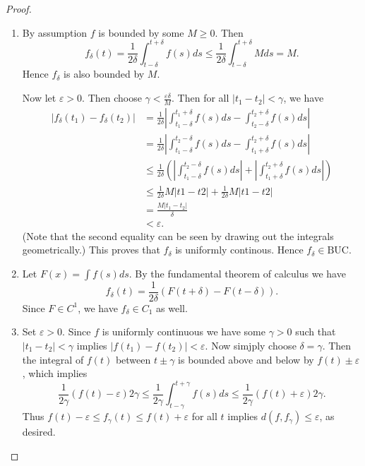 \documentclass[12pt]{article}
\theoremstyle{remark}
\theoremstyle{named}
\renewcommand{\d}{\delta}
\newcommand{\e}{\varepsilon}
\newcommand{\abs}[1]{|#1|}
\newcommand{\bigabs}[1]{\left|#1\right|}
\begin{document}
\begin{proof}
    \hspace*{0in}
    \begin{enumerate}
        \item By assumption \(f\) is bounded by some \(M \ge 0\). Then 
        \[f_\d(t) = \frac{1}{2\d}\int_{t - \d}^{t + \d} f(s)ds \le \frac{1}{2\d}\int_{t - \d}^{t + \d} M ds = M.\]
        Hence \(f_\d\) is also bounded by \(M\). 

        Now let \(\e > 0\). Then choose \(\gamma < \frac{\e \d}{M}\). Then for all \(\abs{t_1 - t_2} < \gamma\), we have
        \begin{align*}
            \abs{f_\d(t_1) - f_\d(t_2)} &= \frac{1}{2\d}\bigabs{\int_{t_1 - \d}^{t_1 + \d} f(s)ds - \int_{t_2 - \d}^{t_2 + \d} f(s)ds} \\
            &= \frac{1}{2\d}\bigabs{\int_{t_1 - \d}^{t_2 - \d} f(s)ds - \int_{t_1 + \d}^{t_2 + \d} f(s)ds} \\
            &\le \frac{1}{2\d}\left(\bigabs{\int_{t_1 - \d}^{t_2 - \d} f(s)ds} + \bigabs{\int_{t_1 + \d}^{t_2 + \d} f(s)ds}\right)\\
            &\le \frac{1}{2\d}M\bigabs{t1 - t2} + \frac{1}{2\d}M\bigabs{t1 - t2} \\
            &= \frac{M\abs{t_1 - t_2}}{\d} \\
            &< \e.
        \end{align*}
        (Note that the second equality can be seen by drawing out the integrals geometrically.) This proves that \(f_\d\) is uniformly continous. Hence \(f_\d \in \text{BUC}\).
        \item Let \(F(x) = \int f(s) ds\). By the fundamental theorem of calculus we have \[f_\d(t) = \frac{1}{2\d}(F(t + \d) - F(t - \d)).\]
        Since \(F \in C^1\), we have \(f_\d \in C_1\) as well.
        \item Set \(\e > 0\). Since \(f\) is uniformly continuous we have some \(\gamma > 0\) such that \(\abs{t_1 - t_2} < \gamma\) implies \(\abs{f(t_1) - f(t_2)} < \e\). Now simjply choose \(\d = \gamma\). Then the integral of \(f(t)\) between \(t \pm \gamma\) is bounded above and below by \(f(t) \pm \e\), which implies  
        \[\frac{1}{2\gamma}(f(t) - \e)2\gamma \le \frac{1}{2\gamma}\int_{t - \gamma}^{t + \gamma} f(s)ds \le \frac{1}{2\gamma}(f(t) + \e)2\gamma.\]
        Thus \(f(t) - \e \le f_\gamma(t) \le f(t) + \e\) for all \(t\) implies \(d(f, f_\gamma) \le \e\), as desired.
    \end{enumerate}
\end{proof}
\end{document}
